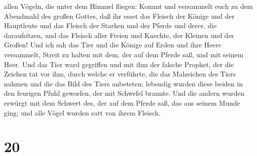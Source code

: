 allen Vögeln, die unter dem Himmel fliegen: Kommt und versammelt euch zu
dem Abendmahl des großen Gottes,  daß ihr esset das Fleisch
der Könige und der Hauptleute und das Fleisch der Starken und der Pferde
und derer, die daraufsitzen, und das Fleisch aller Freien und Knechte,
der Kleinen und der Großen!  Und ich sah das Tier und die
Könige auf Erden und ihre Heere versammelt, Streit zu halten mit dem,
der auf dem Pferde saß, und mit seinem Heer.  Und das Tier
ward gegriffen und mit ihm der falsche Prophet, der die Zeichen tat vor
ihm, durch welche er verführte, die das Malzeichen des Tiers nahmen und
die das Bild des Tiers anbeteten; lebendig wurden diese beiden in den
feurigen Pfuhl geworfen, der mit Schwefel brannte.  Und die
andern wurden erwürgt mit dem Schwert des, der auf dem Pferde saß, das
aus seinem Munde ging; und alle Vögel wurden satt von ihrem Fleisch.

\hypertarget{section-19}{%
\section{20}\label{section-19}}

